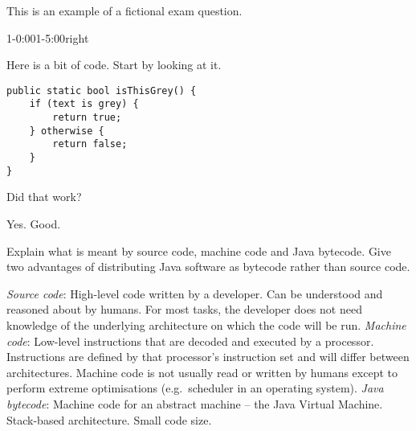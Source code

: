 


This is an example of a fictional exam question.

\the\topskip

\the\partopsep

\the\topsep


\begin{vsvframe}{1-0:00}{1-5:00}{right}

\begin{enumerate}[(a)]
Here is a bit of code. Start by looking at it.

\begin{Verbatim}
public static bool isThisGrey() {
    if (text is grey) {
        return true;
    } otherwise {
        return false;
    }
}
\end{Verbatim}

Did that work?

\begin{itemize}
Yes. Good.
\end{itemize}

Explain what is meant by source code, machine code and Java bytecode.
Give two advantages of distributing Java software as bytecode rather than source code.

\begin{itemize}
\emph{Source code}:
High-level code written by a developer.
Can be understood and reasoned about by humans.
For most tasks, the developer does not need knowledge of the underlying architecture on which the code will be run.
\emph{Machine code}:
Low-level instructions that are decoded and executed by a processor.
Instructions are defined by that processor's instruction set and will differ between architectures.
Machine code is not usually read or written by humans except to perform extreme optimisations (e.g.\ scheduler in an operating system).
\emph{Java bytecode}:
Machine code for an abstract machine -- the Java Virtual Machine.
Stack-based architecture.
Small code size.
\end{itemize}
\end{enumerate}
\end{vsvframe}



